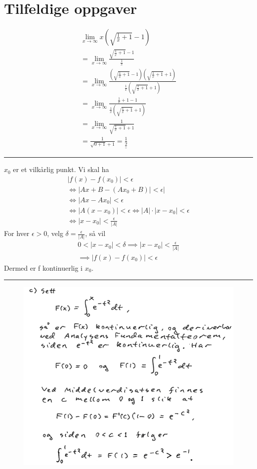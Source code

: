 \documentclass[defaultpackages]{cheatsheet}
\def\doubleunderline#1{\underline{\underline{#1}}}
\begin{document}
	\section{Tilfeldige oppgaver}
	\begin{gather*}
		\lim_{x\to\infty} x\left( \sqrt{\frac{1}{x} + 1} -1 \right)\\
		=\lim_{x\to\infty} \frac{\sqrt{\frac{1}{x} + 1} - 1}{\frac{1}{x}}\\
		=\lim_{x\to\infty} \frac{\left(\sqrt{\frac{1}{x} + 1} - 1\right)\left(\sqrt{\frac{1}{x} + 1} + 1\right)}{\frac{1}{x}\left(\sqrt{\frac{1}{x} + 1} + 1\right)}\\
		=\lim_{x\to\infty} \frac{\frac{1}{x} + 1 - 1}{\frac{1}{x}\left(\sqrt{\frac{1}{x} + 1} + 1\right)}\\
		=\lim_{x\to\infty} \frac{1}{\sqrt{\frac{1}{x} + 1} + 1}\\
		=\frac{1}{\sqrt{0 + 1} + 1}=\doubleunderline{\frac{1}{2}}
	\end{gather*}
	\rule{\columnwidth}{0.5pt}
	$x_0$ er et vilkårlig punkt. Vi skal ha
	\begin{gather*}
		|f(x) - f(x_0)| < \epsilon\\
		\Leftrightarrow |Ax+B - (Ax_0 + B)|<\epsilon|\\
		\Leftrightarrow |Ax - Ax_0|<\epsilon\\
		\Leftrightarrow |A(x-x_0)| < \epsilon
		\Leftrightarrow |A|\cdot|x-x_0| < \epsilon\\
		\Leftrightarrow |x-x_0|<\frac{\epsilon}{|A|}
	\end{gather*}
	For hver $\epsilon>0$, velg $\delta = \frac{\epsilon}{|A|}$, så vil
	\begin{gather*}
		0 < | x - x_0 | < \delta \implies |x-x_0|<\frac{\epsilon}{|A|}\\
		\implies |f(x) - f(x_0)|<\epsilon
	\end{gather*}
	Dermed er f kontinuerlig i $x_0$.
	\rule{\columnwidth}{0.5pt}
	\begin{figure}[H]
		\includegraphics[width=\columnwidth]{idk2.png}
	\end{figure}
	
\end{document}
